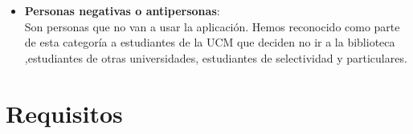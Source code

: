 \documentclass[12pt]{article}
\begin{document}
\begin{itemize}
\begin{itemize}
	\item \textbf{Personas negativas o antipersonas}: \\
		Son personas que no van a usar la aplicación. Hemos reconocido como parte de esta categoría a  estudiantes de la UCM que deciden no ir a la biblioteca ,estudiantes de otras universidades, estudiantes de selectividad y particulares. 
		
\end{itemize}
\end{itemize}

\newpage
\section{Requisitos}
\end{document}
